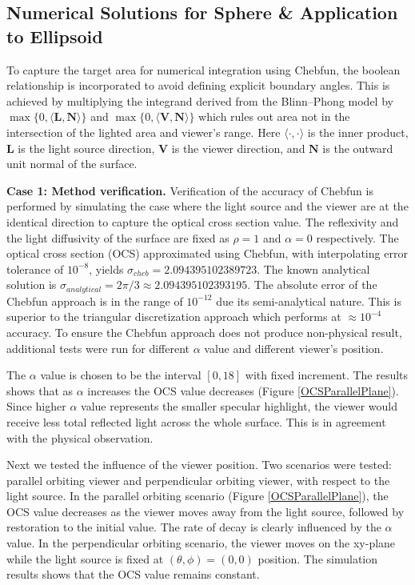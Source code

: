 \documentclass[11pt]{amsart}
\theoremstyle{definition}
\begin{document}
\subsection{Numerical Solutions for Sphere \& Application to Ellipsoid}

To capture the target area for numerical integration using Chebfun, the boolean relationship is incorporated to avoid defining explicit boundary angles. This is achieved by multiplying the integrand derived from the Blinn--Phong model by $\max\{0, \langle \mathbf{L},\mathbf{N}\rangle\}$ and $\max\{0,\langle \mathbf{V},\mathbf{N}\rangle\}$ which rules out area not in the intersection of the lighted area and viewer's range. Here $\langle\cdot, \cdot\rangle$ is the inner product, $\mathbf{L}$ is the light source direction, $\mathbf{V}$ is the viewer direction, and $\mathbf{N}$ is the outward unit normal of the surface.

{\bf Case 1: Method verification.} Verification of the accuracy of Chebfun is performed by simulating the case where the light source and the viewer are at the identical direction to capture the optical cross section value. The reflexivity and the light diffusivity of the surface are fixed as $\rho = 1$ and $\alpha =0$ respectively. The optical cross section (OCS) approximated using Chebfun, with interpolating error tolerance of $10^{-8}$, yields $\sigma_{cheb} = 2.094395102389723$. The known analytical solution is $\sigma_{analytical} = 2\pi/3 \approx 2.094395102393195$. The absolute error of the Chebfun approach is in the range of $10^{-12}$ due its semi-analytical nature. This is superior to the triangular discretization approach which performs at $\approx 10^{-4}$ accuracy. To ensure the Chebfun approach does not produce non-physical result, additional tests were run for different $\alpha$ value and different viewer's position.

The $\alpha$ value is chosen to be the interval $[0,18]$ with fixed increment. The results shows that as $\alpha$ increases the OCS value decreases (Figure \ref{OCSParallelPlane}). Since higher $\alpha$ value represents the smaller specular highlight, the viewer would receive less total reflected light across the whole surface. This is in agreement with the physical observation.

Next we tested the influence of the viewer position. Two scenarios were tested: parallel orbiting viewer and perpendicular orbiting viewer, with respect to the light source. In the parallel orbiting scenario (Figure \ref{OCSParallelPlane}), the OCS value decreases as the viewer moves away from the light source, followed by restoration to the initial value. The rate of decay is clearly influenced by the $\alpha$ value. In the perpendicular orbiting scenario, the viewer moves on the xy-plane while the light source is fixed at $(\theta, \phi) = (0,0)$ position. The simulation results shows that the OCS value remains constant.
\end{document}
